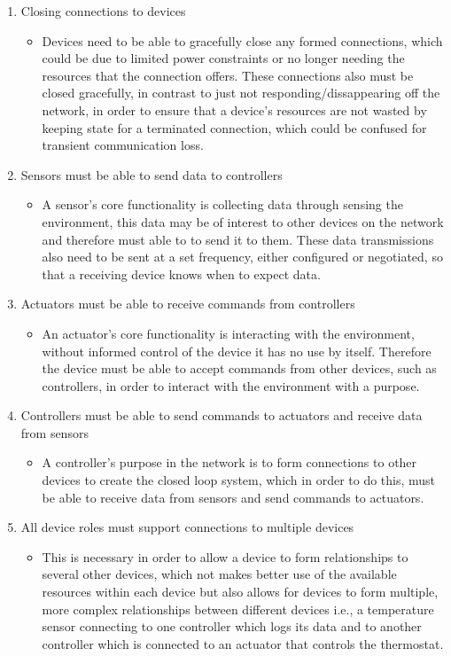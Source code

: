 \begin{enumerate}
\begin{itemize}
	\end{itemize}
	\item Closing connections to devices
	\begin{itemize}
		\item Devices need to be able to gracefully close any formed connections, which could be due to limited power constraints or no longer needing the resources that the connection offers. These connections also must be closed gracefully, in contrast to just not responding/dissappearing off the network, in order to ensure that a device's resources are not wasted by keeping state for a terminated connection, which could be confused for transient communication loss.
	\end{itemize}
	\item Sensors must be able to send data to controllers
	\begin{itemize}
		\item A sensor's core functionality is collecting data through sensing the environment, this data may be of interest to other devices on the network and therefore must able to to send it to them. These data transmissions also need to be sent at a set frequency, either configured or negotiated, so that a receiving device knows when to expect data.
	\end{itemize}
	\item Actuators must be able to receive commands from controllers
	\begin{itemize}
		\item An actuator's core functionality is interacting with the environment, without informed control of the device it has no use by itself. Therefore the device must be able to accept commands from other devices, such as controllers, in order to interact with the environment with a purpose.
	\end{itemize}
	\item Controllers must be able to send commands to actuators and receive data from sensors
	\begin{itemize}
		\item A controller's purpose in the network is to form connections to other devices to create the closed loop system, which in order to do this, must be able to receive data from sensors and send commands to actuators. 
	\end{itemize}
	\item All device roles must support connections to multiple devices 
	\begin{itemize}
		\item This is necessary in order to allow a device to form relationships to several other devices, which not makes better use of the available resources within each device but also allows for devices to form multiple, more complex relationships between different devices i.e., a temperature sensor connecting to one controller which logs its data and to another controller which is connected to an actuator that controls the thermostat.

\end{itemize}
\end{enumerate}
